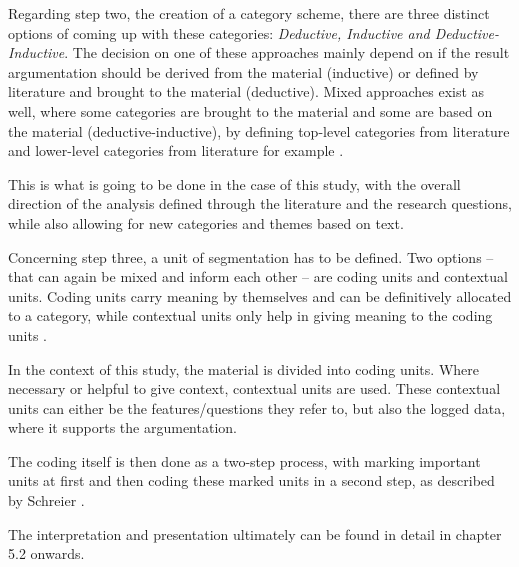 Regarding step two, the creation of a category scheme, there are three distinct options of coming up with these categories: \textit{Deductive, Inductive and Deductive-Inductive}. The decision on one of these approaches mainly depend on if the result argumentation should be derived from the material (inductive) or defined by literature and brought to the material (deductive). Mixed approaches exist as well, where some categories are brought to the material and some are based on the material (deductive-inductive), by defining top-level categories from literature and lower-level categories from literature for example \cite{schreier2014ways}.

This is what is going to be done in the case of this study, with the overall direction of the analysis defined through the literature and the research questions, while also allowing for new categories and themes based on text.

Concerning step three, a unit of segmentation has to be defined. Two options -- that can again be mixed and inform each other -- are coding units and contextual units. Coding units carry meaning by themselves and can be definitively allocated to a category, while contextual units only help in giving meaning to the coding units \cite{schreier2014ways}.

In the context of this study, the material is divided into coding units. Where necessary or helpful to give context, contextual units are used. These contextual units can either be the features/questions they refer to, but also the logged data, where it supports the argumentation.

The coding itself is then done as a two-step process, with marking important units at first and then coding these marked units in a second step, as described by Schreier \cite{schreier2014ways}.

The interpretation and presentation ultimately can be found in detail in chapter 5.2 onwards.